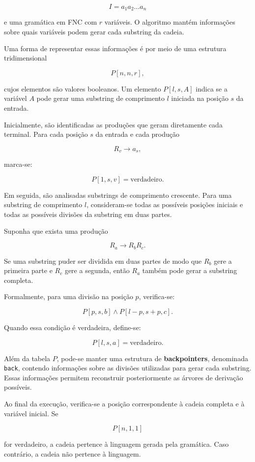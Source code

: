 \documentclass[
  brazilian,
  letterpaper,
]{book}
\theoremstyle{plain}
\theoremstyle{definition}
\theoremstyle{remark}
\begin{document}
\[
I=a_1a_2\ldots a_n
\]

e uma gramática em FNC com \(r\) variáveis. O algoritmo mantém
informações sobre quais variáveis podem gerar cada substring da cadeia.

Uma forma de representar essas informações é por meio de uma estrutura
tridimensional

\[
P[n,n,r],
\]

cujos elementos são valores booleanos. Um elemento \(P[l,s,A]\) indica
se a variável \(A\) pode gerar uma substring de comprimento \(l\)
iniciada na posição \(s\) da entrada.

Inicialmente, são identificadas as produções que geram diretamente cada
terminal. Para cada posição \(s\) da entrada e cada produção

\[
R_v\rightarrow a_s,
\]

marca-se:

\[
P[1,s,v]=\text{verdadeiro}.
\]

Em seguida, são analisadas substrings de comprimento crescente. Para uma
substring de comprimento \(l\), consideram-se todas as possíveis
posições iniciais e todas as possíveis divisões da substring em duas
partes.

Suponha que exista uma produção

\[
R_a\rightarrow R_bR_c.
\]

Se uma substring puder ser dividida em duas partes de modo que \(R_b\)
gere a primeira parte e \(R_c\) gere a segunda, então \(R_a\) também
pode gerar a substring completa.

Formalmente, para uma divisão na posição \(p\), verifica-se:

\[
P[p,s,b]\land P[l-p,s+p,c].
\]

Quando essa condição é verdadeira, define-se:

\[
P[l,s,a]=\text{verdadeiro}.
\]

Além da tabela \(P\), pode-se manter uma estrutura de
\textbf{backpointers}, denominada \texttt{back}, contendo informações
sobre as divisões utilizadas para gerar cada substring. Essas
informações permitem reconstruir posteriormente as árvores de derivação
possíveis.

Ao final da execução, verifica-se a posição correspondente à cadeia
completa e à variável inicial. Se

\[
P[n,1,1]
\]

for verdadeiro, a cadeia pertence à linguagem gerada pela gramática.
Caso contrário, a cadeia não pertence à linguagem.
\end{document}
